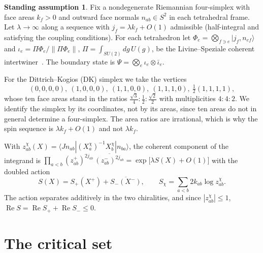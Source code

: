\documentclass[11pt]{article}
\numberwithin{equation}{section}
\theoremstyle{definition}
\newtheorem{assumption}[theorem]{Standing assumption}
\theoremstyle{remark}
\newcommand{\SUtwo}{SU(2)}
\renewcommand{\Re}{\operatorname{Re}}
\begin{document}
\begin{assumption}\label{ass:data}
Fix a nondegenerate Riemannian four-simplex with face areas $k_f>0$ and outward
face normals $n_{ab}\in S^2$ in each tetrahedral frame. Let $\lambda\to\infty$
along a sequence with $j_f=\lambda k_f+O(1)$ admissible (half-integral and
satisfying the coupling conditions). For each tetrahedron let
$\Phi_e=\bigotimes_{f\ni e}|j_f,n_{ef}\rangle$ and
$\iota_e=\Pi\Phi_e/\|\Pi\Phi_e\|$, $\Pi=\int_{\SUtwo}dg\,U(g)$, be the
Livine--Speziale coherent intertwiner~\cite{LivineSpeziale2007}. The boundary
state is $\Psi=\bigotimes_e\iota_e\otimes\bar\iota_e$.
\end{assumption}

For the Dittrich--Kogios (DK) simplex we take the vertices
\[
(0,0,0,0),\ (1,0,0,0),\ (1,1,0,0),\ (1,1,1,0),\ \tfrac12(1,1,1,1),
\]
whose ten face areas stand in the ratios
$\tfrac{\sqrt3}{4}:\tfrac12:\tfrac{\sqrt2}{2}$ with multiplicities $4:4:2$. We
identify the simplex by its coordinates, not by its areas, since ten areas do not
in general determine a four-simplex. The area ratios are irrational, which is why
the spin sequence is $\lambda k_f+O(1)$ and not $\lambda k_f$.

With $z^\chi_{ab}(X)=\langle Jn_{ab}|(X_a^\chi)^{-1}X_b^\chi|n_{ba}\rangle$, the
coherent component of the integrand is
$\prod_{a<b}(z^+_{ab})^{2j_{ab}}\,\overline{(z^-_{ab})^{2j_{ab}}}
=\exp\bigl[\lambda S(X)+O(1)\bigr]$ with the doubled action
\begin{equation}\label{eq:action}
S(X)=S_+(X^+)+\overline{S_-(X^-)},\qquad
S_\chi=\sum_{a<b}2k_{ab}\log z^\chi_{ab}.
\end{equation}
The action separates additively in the two chiralities, and since
$|z^\chi_{ab}|\le1$, $\Re S=\Re S_++\Re S_-\le0$.

\section{The critical set}\label{sec:critical}
\end{document}
